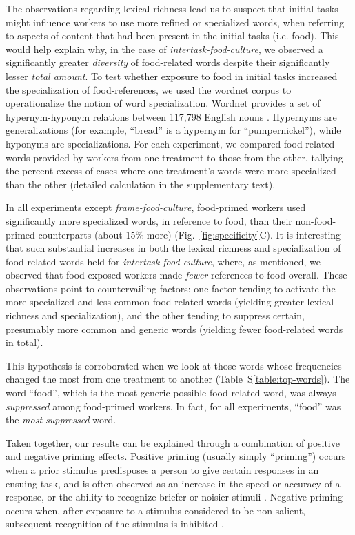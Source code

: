 \documentclass[12pt]{article}
\begin{document}
The observations regarding lexical richness lead us to suspect that 
initial tasks might influence workers to use more refined or specialized 
words, when referring to aspects of content that had been present in the 
initial tasks (i.e. food).  This would help explain why, in the case of 
\textit{intertask-food-culture}, we observed a significantly greater 
\textit{diversity} of food-related words despite their significantly lesser 
\textit{total amount}.
To test whether exposure to food in initial tasks increased the specialization
of food-references, we used the wordnet corpus to operationalize the 
notion of word specialization.  Wordnet provides a set of hypernym-hyponym 
relations between 117,798 English nouns 
\cite{miller1995wordnet,felbaum1998wordnet}.  Hypernyms are generalizations 
(for example, ``bread'' is a hypernym for 
``pumpernickel''), while hyponyms are specializations.
For each experiment, we compared food-related words provided by workers from 
one treatment to those from the other, tallying the percent-excess of
cases where one treatment's words were more specialized than the other 
(detailed calculation in the supplementary text). 

In all experiments except \textit{frame-food-culture}, food-primed workers 
used significantly more specialized words, in reference to food, 
than their non-food-primed 
counterparts (about 15\% more) (Fig.~\ref{fig:specificity}C).
It is interesting that such substantial increases in both the lexical 
richness and specialization of food-related words 
held for \textit{intertask-food-culture}, where, as mentioned, we observed 
that food-exposed workers made \textit{fewer} references to food overall. 
These observations point 
to countervailing factors: one factor tending to activate the more 
specialized and less common food-related words 
(yielding greater lexical richness and specialization), and the other tending 
to suppress certain, presumably more common and generic words 
(yielding fewer food-related words in total).

This hypothesis is corroborated when we look at those words whose 
frequencies changed the most from one treatment to another 
(Table~S\ref{table:top-words}).  
The word ``food'', which is the most generic possible food-related word, was 
always \textit{suppressed} among food-primed workers.  In fact, 
for all experiments, ``food'' was the \textit{most suppressed} word.

Taken together, our results can be 
explained through a combination of positive and negative priming effects.
Positive priming (usually simply ``priming'') occurs when a prior stimulus 
predisposes a person to give certain responses in an ensuing task, and
is often observed as an increase in the speed or accuracy of a response, or
the ability to recognize briefer or noisier stimuli 
\cite{BJOP1796,BJOP1826,Huber2008324}.
Negative priming occurs when, after exposure to a stimulus 
considered to be non-salient, subsequent recognition of the stimulus is 
inhibited \cite{mayr2007negative}.
\end{document}
